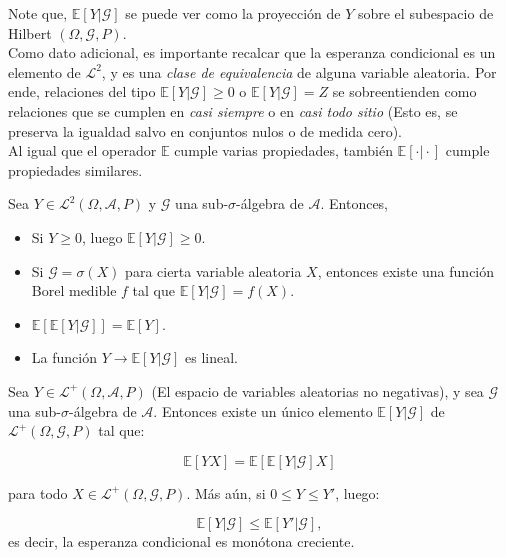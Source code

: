 Note que, $\mathbb{E}[Y \vert \mathcal{G}]$ se puede ver como la proyección de $Y$ sobre el subespacio de Hilbert $(\Omega, \mathcal{G}, P)$. \\

Como dato adicional, es importante recalcar que la esperanza condicional es un elemento de $\mathcal{L}^2$, y es una \textit{clase de equivalencia} de alguna variable aleatoria. Por ende, relaciones del tipo $\mathbb{E}[Y \vert \mathcal{G}] \geq 0$ o $\mathbb{E}[Y \vert \mathcal{G}] = Z$ se sobreentienden como relaciones que se cumplen en \textit{casi siempre} o en \textit{casi todo sitio} (Esto es, se preserva la igualdad salvo en conjuntos nulos o de medida cero).\\

Al igual que el operador $\mathbb{E}$ cumple varias propiedades, también $\mathbb{E}[\cdot \vert  \cdot]$ cumple propiedades similares.

\begin{theorem}
	Sea $Y \in \mathcal{L}^2 (\Omega, \mathcal{A}, P)$ y $\mathcal{G}$ una sub-$\sigma$-álgebra de $\mathcal{A}$. Entonces, 

	\begin{itemize}
		\item Si $Y \geq 0$, luego $\mathbb{E}[Y \vert \mathcal{G}] \geq 0$.
		\item Si $\mathcal{G} = \sigma (X)$ para cierta variable aleatoria $X$, entonces existe una función Borel medible $f$ tal que $\mathbb{E}[Y \vert \mathcal{G}] = f(X)$.
		\item $\mathbb{E}[\mathbb{E}[Y \vert \mathcal{G}]] = \mathbb{E}[Y]$.
		\item La función $Y \rightarrow \mathbb{E}[Y \vert \mathcal{G}]$ es lineal.
	\end{itemize}
\end{theorem}


\begin{theorem}
	Sea $Y \in \mathcal{L}^{+}(\Omega, \mathcal{A}, P)$ (El espacio de variables aleatorias no negativas), y sea $\mathcal{G}$ una sub-$\sigma$-álgebra de $\mathcal{A}$. Entonces existe un único elemento $\mathbb{E}[Y \vert \mathcal{G}]$ de $\mathcal{L}^{+}(\Omega, \mathcal{G}, P)$ tal que:

	\[
		\mathbb{E}[Y X] = \mathbb{E}[ \mathbb{E}[Y \vert \mathcal{G}] X ]
	\]
 	
 	para todo $X \in \mathcal{L}^{+}(\Omega, \mathcal{G}, P)$. Más aún, si $0 \leq Y \leq Y'$, luego:

 	\[
 		\mathbb{E}[Y \vert \mathcal{G}] \leq \mathbb{E}[Y' \vert \mathcal{G}],
 	\]
 	es decir, la esperanza condicional es monótona creciente.
\end{theorem}

